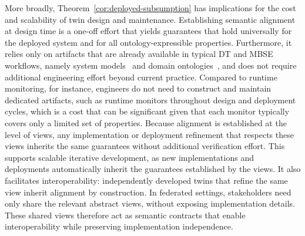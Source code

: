 More broadly, Theorem~\ref{cor:deployed-subsumption} has implications for the cost and scalability of twin design and maintenance. Establishing semantic alignment at design time is a one-off effort that yields guarantees that hold universally for the deployed system and for all ontology-expressible properties. Furthermore, it relies only on artifacts that are already available in typical DT and MBSE workflows, namely system models~\cite{INCOSE2023} and domain ontologies~\cite{Boje2024DTSemantics,elhajj2026semantic,10.1145/3652620.3688261,GrangelGonzalez2016,Bader2019SemanticAAS,Arm2021AAS,farias2024dtag}, and does not require additional engineering effort beyond current practice. Compared to runtime monitoring, for instance, engineers do not need to construct and maintain dedicated artifacts, such as runtime monitors throughout design and deployment cycles, which is a cost that can be significant given that each monitor typically covers only a limited set of properties.
Because alignment is established at the level of views, any implementation or deployment refinement that respects these views inherits the same guarantees without additional verification effort. This supports scalable iterative development, as new implementations and deployments automatically inherit the guarantees established by the views. It also facilitates interoperability: independently developed twins that refine the same view inherit alignment by construction. In federated settings, stakeholders need only share the relevant abstract views, without exposing implementation details. These shared views therefore act as semantic contracts that enable interoperability while preserving implementation independence.





